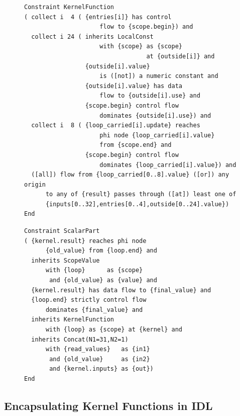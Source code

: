 \begin{figure}[p]
\begin{lstlisting}[language=IDL]
Constraint KernelFunction
( collect i  4 ( {entries[i]} has control
                     flow to {scope.begin}) and
  collect i 24 ( inherits LocalConst
                     with {scope} as {scope}
                                  at {outside[i]} and
                 {outside[i].value}
                     is ([not]) a numeric constant and
                 {outside[i].value} has data
                     flow to {outside[i].use} and
                 {scope.begin} control flow
                     dominates {outside[i].use}) and
  collect i  8 ( {loop_carried[i].update} reaches
                     phi node {loop_carried[i].value}
                     from {scope.end} and
                 {scope.begin} control flow
                     dominates {loop_carried[i].value}) and
  ([all]) flow from {loop_carried[0..8].value} ([or]) any origin
      to any of {result} passes through ([at]) least one of
      {inputs[0..32],entries[0..4],outside[0..24].value})
End
\end{lstlisting}
\begin{lstlisting}[language=IDL,label={IDLscalarPart},caption=
   {IDL specification of a scalar reduction within a complex reduction and
    histogram computation:
    The kernel function operates within a loop.
    Its input \texttt{kernel.inputs} is composed of \texttt{read\_values} and
    the reduction value of the previous iteration, concatenated with
    \texttt{Concat}.}]
Constraint ScalarPart
( {kernel.result} reaches phi node
      {old_value} from {loop.end} and
  inherits ScopeValue
      with {loop}      as {scope}
       and {old_value} as {value} and 
  {kernel.result} has data flow to {final_value} and
  {loop.end} strictly control flow
      dominates {final_value} and
  inherits KernelFunction
      with {loop} as {scope} at {kernel} and
  inherits Concat(N1=31,N2=1)
      with {read_values}   as {in1}
       and {old_value}     as {in2}
       and {kernel.inputs} as {out})
End
\end{lstlisting}
\end{figure}

\subsection{Encapsulating Kernel Functions in IDL}

